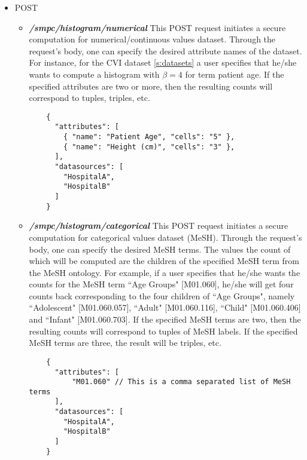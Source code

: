 \begin{itemize}
  \item POST
  \begin{itemize}[label=$\circ$]

    \item \textbf{\textit{/smpc/histogram/numerical}}
    This POST request initiates a secure computation for numerical/continuous values dataset.
    Through the request's body, one can specify the desired attribute names of the dataset.
    For instance, for the CVI dataset \ref{s:datasets} a user specifies that he/she wants to compute a histogram with $\beta = 4$ for term patient age.
    If the specified attributes are two or more, then the resulting counts will correspond to tuples, triples, etc.

    {
    \begin{verbatim}
    {
      "attributes": [
        { "name": "Patient Age", "cells": "5" },
        { "name": "Height (cm)", "cells": "3" },
      ],
      "datasources": [
        "HospitalA",
        "HospitalB"
      ]
    }
    \end{verbatim}
    \label{sc:histogram-numerical-post}
    }



    \item \textbf{\textit{/smpc/histogram/categorical}}
    This POST request initiates a secure computation for categorical values dataset (MeSH).
    Through the request's body, one can specify the desired MeSH terms.
    The values the count of which will be computed are the children of the specified MeSH term from the MeSH ontology.
    For example, if a user specifies that he/she wants the counts for the MeSH term ``Age Groups" [M01.060], he/she will get four counts back corresponding to the four children of ``Age Groups", namely ``Adolescent" [M01.060.057], ``Adult" [M01.060.116], ``Child" [M01.060.406] and ``Infant" [M01.060.703].
    If the specified MeSH terms are two, then the resulting counts will correspond to tuples of MeSH labels.
    If the specified MeSH terms are three, the result will be triples, etc.

    {
    \begin{verbatim}
    {
      "attributes": [
          "M01.060" // This is a comma separated list of MeSH terms
      ],
      "datasources": [
        "HospitalA",
        "HospitalB"
      ]
    }
    \end{verbatim}
    \label{sc:histogram-categorical-post}
    }



\end{itemize}
\end{itemize}
